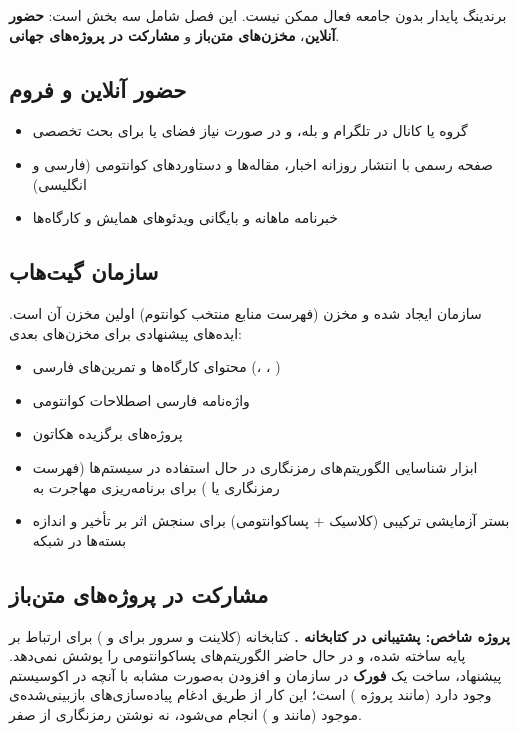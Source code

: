 \documentclass[a4paper,12pt]{article}
\begin{document}
	برندینگ پایدار بدون جامعه فعال ممکن نیست. این فصل شامل سه بخش است:
	\textbf{حضور آنلاین}، \textbf{مخزن‌های متن‌باز} و \textbf{مشارکت در پروژه‌های جهانی}.

	\subsection{حضور آنلاین و فروم}
	\begin{itemize}[rightmargin=0.5cm, itemsep=4pt]
		\item گروه یا کانال در تلگرام و بله، و در صورت نیاز فضای  یا  برای بحث تخصصی
		\item صفحه رسمی  با انتشار روزانه اخبار، مقاله‌ها و دستاوردهای کوانتومی (فارسی و انگلیسی)
		\item خبرنامه ماهانه و بایگانی ویدئوهای همایش و کارگاه‌ها
	\end{itemize}

	\subsection{سازمان گیت‌هاب}
	سازمان  ایجاد شده و مخزن
	\href{https://github.com/mci-quantum-lab/quantum-awesome}{}
	(فهرست منابع منتخب کوانتوم) اولین مخزن آن است. ایده‌های پیشنهادی برای مخزن‌های بعدی:
	\begin{itemize}[rightmargin=0.5cm, itemsep=3pt]
		\item محتوای کارگاه‌ها و تمرین‌های فارسی (، ، )
		\item واژه‌نامه فارسی اصطلاحات کوانتومی
		\item پروژه‌های برگزیده هکاتون
		\item ابزار شناسایی الگوریتم‌های رمزنگاری در حال استفاده در سیستم‌ها (فهرست رمزنگاری یا ) برای برنامه‌ریزی مهاجرت به 
		\item بستر آزمایشی  ترکیبی (کلاسیک + پساکوانتومی) برای سنجش اثر بر تأخیر و اندازه بسته‌ها در شبکه
	\end{itemize}

	\subsection{مشارکت در پروژه‌های متن‌باز}
	\textbf{پروژه شاخص: پشتیبانی  در کتابخانه .}
	کتابخانه \href{https://github.com/MohammadRaziei/httpp}{}
	(کلاینت و سرور  برای  و ) برای ارتباط  بر پایه  ساخته شده،
	و  در حال حاضر الگوریتم‌های پساکوانتومی را پوشش نمی‌دهد.
	پیشنهاد، ساخت یک \textbf{فورک} در سازمان  و افزودن 
	به‌صورت مشابه با آنچه در اکوسیستم  وجود دارد (مانند پروژه ) است؛ این کار از طریق ادغام پیاده‌سازی‌های بازبینی‌شده‌ی موجود (مانند  و ) انجام می‌شود، نه نوشتن رمزنگاری از صفر.
\end{document}
